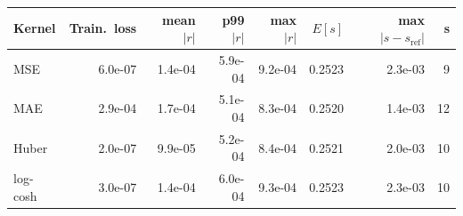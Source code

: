 \begin{tabular}{lrrrrrrr}
\toprule
Kernel & Train.\ loss & mean $|r|$ & p99 $|r|$ & max $|r|$ & $E[s]$ & max $|s-s_{\mathrm{ref}}|$ & s \\
\midrule
MSE & 6.0e-07 & 1.4e-04 & 5.9e-04 & 9.2e-04 & 0.2523 & 2.3e-03 & 9 \\
MAE & 2.9e-04 & 1.7e-04 & 5.1e-04 & 8.3e-04 & 0.2520 & 1.4e-03 & 12 \\
Huber & 2.0e-07 & 9.9e-05 & 5.2e-04 & 8.4e-04 & 0.2521 & 2.0e-03 & 10 \\
log-cosh & 3.0e-07 & 1.4e-04 & 6.0e-04 & 9.3e-04 & 0.2523 & 2.3e-03 & 10 \\
\bottomrule
\end{tabular}
